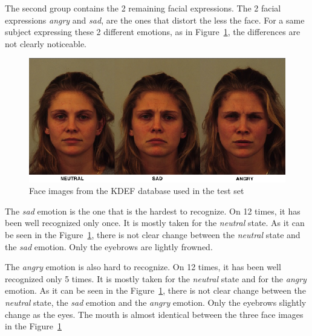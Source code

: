 \noindent The second group contains the 2 remaining facial expressions. The 2 facial expressions \textit{angry} and \textit{sad}, are the ones that distort the less the face. For a same subject expressing these 2 different emotions, as in Figure~\ref{kdef_no_difference_emotions}, the differences are not clearly noticeable.
\newline

\begin{figure}[!h]
\begin{center}
\noindent \includegraphics[scale=0.5]{figures/kdef_no_difference_emotions} 
\newline
\caption{Face images from the KDEF database used in the test set}
\label{kdef_no_difference_emotions}
\end{center} 
\end{figure}

\noindent The \textit{sad} emotion is the one that is the hardest to recognize. On 12 times, it has been well recognized only once. It is mostly taken for the \textit{neutral} state. As it can be seen in the Figure~\ref{kdef_no_difference_emotions}, there is not clear change between the \textit{neutral} state and the \textit{sad} emotion. Only the eyebrows are lightly frowned.
\newline

\noindent The \textit{angry} emotion is also hard to recognize. On 12 times, it has been well recognized only 5 times. It is mostly taken for the \textit{neutral} state and for the \textit{angry} emotion. As it can be seen in the Figure~\ref{kdef_no_difference_emotions}, there is not clear change between the \textit{neutral} state, the \textit{sad} emotion and the \textit{angry} emotion. Only the eyebrows slightly change as the eyes. The mouth is almost identical between the three face images in the Figure~\ref{kdef_no_difference_emotions}
\newline

